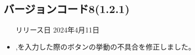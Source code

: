 \subsection*{バージョンコード8(1.2.1)}
\begin{itemize}
    \item[リリース日] 2024年4月11日
\end{itemize}

\new \par
\change \par
\fix
\begin{itemize}
    \item \clientId ,\clientSecret を入力した際のボタンの挙動の不具合を修正しました。
\end{itemize}
